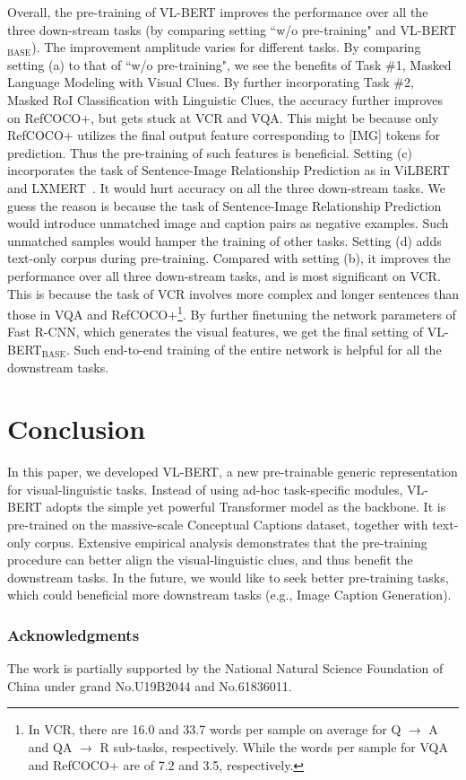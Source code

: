 Overall, the pre-training of VL-BERT improves the performance over all the three down-stream tasks (by comparing setting ``w/o pre-training" and  VL-BERT$_\text{BASE}$). The improvement amplitude varies for different tasks. By comparing setting (a) to that of ``w/o pre-training", we see the benefits of Task \#1, Masked Language Modeling with Visual Clues. By further incorporating Task \#2, Masked RoI Classification with Linguistic Clues, the accuracy further improves on RefCOCO+, but gets stuck at VCR and VQA.  This might be because only RefCOCO+ utilizes the final output feature corresponding to [IMG] tokens for prediction. Thus the pre-training of such features is beneficial. Setting (c) incorporates the task of Sentence-Image Relationship Prediction as in ViLBERT~\citep{lu2019vilbert} and LXMERT~\citep{tan2019lxmert}. It would hurt accuracy on all the three down-stream tasks. We guess the reason is because the task of Sentence-Image Relationship Prediction would introduce unmatched image and caption pairs as negative examples. Such unmatched samples would hamper the training of other tasks. Setting (d) adds text-only corpus during pre-training. Compared with setting (b), it improves the performance over all three down-stream tasks, and is most significant on VCR. This is because the task of VCR involves more complex and longer sentences than those in VQA and RefCOCO+\footnote{ In VCR, there are 16.0 and 33.7 words per sample on average for Q $\rightarrow$ A and QA $\rightarrow$ R sub-tasks, respectively. While the words per sample for VQA and RefCOCO+ are of 7.2 and 3.5, respectively.}. By further finetuning the network parameters of Fast R-CNN, which generates the visual features, we get the final setting of VL-BERT$_\text{BASE}$. Such end-to-end training of the entire network is helpful for all the downstream tasks.

\section{Conclusion}

In this paper, we developed VL-BERT, a new pre-trainable generic representation for visual-linguistic tasks. Instead of using ad-hoc task-specific modules, VL-BERT adopts the simple yet powerful Transformer model as the backbone. It is pre-trained on the massive-scale Conceptual Captions dataset, together with text-only corpus. Extensive empirical analysis demonstrates that the pre-training procedure can better align the visual-linguistic clues, and thus benefit the downstream tasks. In the future, we would like to seek better pre-training tasks, which could beneficial more downstream tasks (e.g., Image Caption Generation).

\subsubsection*{Acknowledgments}
The work is partially supported by the National Natural Science Foundation of China under grand No.U19B2044 and No.61836011.


